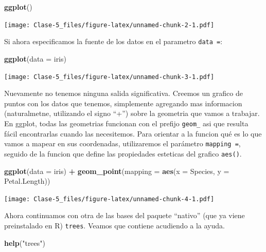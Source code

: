 \documentclass[
]{article}
\newenvironment{Shaded}{\begin{snugshade}}{\end{snugshade}}
\newcommand{\DataTypeTok}[1]{\textcolor[rgb]{0.13,0.29,0.53}{#1}}
\newcommand{\KeywordTok}[1]{\textcolor[rgb]{0.13,0.29,0.53}{\textbf{#1}}}
\newcommand{\NormalTok}[1]{#1}
\newcommand{\OperatorTok}[1]{\textcolor[rgb]{0.81,0.36,0.00}{\textbf{#1}}}
\newcommand{\StringTok}[1]{\textcolor[rgb]{0.31,0.60,0.02}{#1}}
\begin{document}
\begin{Shaded}
\begin{Highlighting}[]
\KeywordTok{ggplot}\NormalTok{()}
\end{Highlighting}
\end{Shaded}

\texttt{[image: Clase-5\_files/figure-latex/unnamed-chunk-2-1.pdf]}

Si ahora especificamos la fuente de los datos en el parametro
\texttt{data\ =}:

\begin{Shaded}
\begin{Highlighting}[]
\KeywordTok{ggplot}\NormalTok{(}\DataTypeTok{data =}\NormalTok{ iris)}
\end{Highlighting}
\end{Shaded}

\texttt{[image: Clase-5\_files/figure-latex/unnamed-chunk-3-1.pdf]}

Nuevamente no tenemos ninguna salida significativa. Creemos un grafico
de puntos con los datos que tenemos, simplemente agregando mas
informacion (naturalmetne, utilizando el signo ``+'') sobre la geometria
que vamos a trabajar. En ggplot, todas las geometrias funcionan con el
prefijo \texttt{geom\_} asi que resulta fácil encontrarlas cuando las
necesitemos. Para orientar a la funcion qué es lo que vamos a mapear en
sus coordenadas, utilizaremos el parámetro \texttt{mapping\ =}, seguido
de la funcion que define las propiedades esteticas del grafico
\texttt{aes()}.

\begin{Shaded}
\begin{Highlighting}[]
\KeywordTok{ggplot}\NormalTok{(}\DataTypeTok{data =}\NormalTok{ iris) }\OperatorTok{+}
\StringTok{  }\KeywordTok{geom\_point}\NormalTok{(}\DataTypeTok{mapping =} \KeywordTok{aes}\NormalTok{(}\DataTypeTok{x =}\NormalTok{ Species, }\DataTypeTok{y =}\NormalTok{ Petal.Length))}
\end{Highlighting}
\end{Shaded}

\texttt{[image: Clase-5\_files/figure-latex/unnamed-chunk-4-1.pdf]}

Ahora continuamos con otra de las bases del paquete ``nativo'' (que ya
viene preinstalado en R) \texttt{trees}. Veamos que contiene acudiendo a
la ayuda.

\begin{Shaded}
\begin{Highlighting}[]
\KeywordTok{help}\NormalTok{(}\StringTok{"trees"}\NormalTok{)}
\end{Highlighting}
\end{Shaded}
\end{document}
